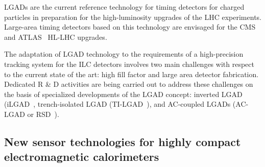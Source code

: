 LGADs are the current reference technology for timing detectors for charged particles in preparation for the high-luminosity upgrades of the LHC experiments. Large-area timing detectors based on this technology are envisaged for the CMS~\cite{Butler:2019rpu} and ATLAS~\cite{Allaire:2018bof} HL-LHC upgrades.

The adaptation of LGAD technology to the requirements of a high-precision tracking system for the ILC detectors involves two main challenges with respect to the current state of the art: high fill factor and large area detector fabrication. Dedicated R \& D activities are being carried out to address these challenges on the basis of specialized developments of the LGAD concept: inverted LGAD (iLGAD~\cite{Pellegrini:2014lki,Curras:2019aky}, trench-isolated LGAD (TI-LGAD~\cite{paternoster}), and AC-coupled LGADs (AC-LGAD or RSD~\cite{Mandurrino:2019csy}). 




\subsection{New sensor technologies for highly compact electromagnetic calorimeters }




